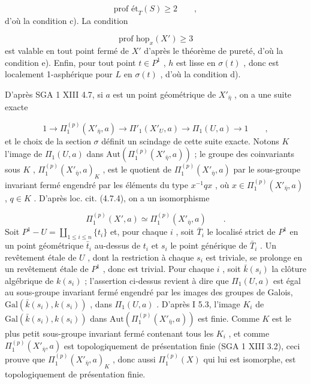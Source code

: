 \begin{equation*}
\text{prof ét}_T(S) \geqslant 2 \qquad ,
\end{equation*}
d'où la condition c). La condition

\begin{equation*}
\text{prof hop}_x(X') \geqslant 3
\end{equation*}
est valable en tout point fermé de $X'$ d'après le théorème de pureté, d'où la condition e). Enfin, pour tout point $t \in P^1$ , $h$ est lisse en $\sigma(t)$ , donc est localement 1-asphérique pour $L$ en $\sigma(t)$ , d'où la condition d).

D'après SGA 1 XIII 4.7, si $a$ est un point géométrique de $X'_{\bar{\eta}}$ , on a une suite exacte

\begin{equation*}
1 \longrightarrow \Pi_1^{(p)}(X'_{\bar{\eta}},a) \longrightarrow \Pi'_1(X'_U,a) \longrightarrow \Pi_1(U,a) \longrightarrow 1 \qquad ,
\end{equation*}
et le choix de la section $\sigma$ définit un scindage de cette suite exacte. Notons $K$ l'image de $\Pi_1(U,a)$ dans $\mathrm{Aut}(\Pi_1^{(p)}(X'_{\bar{\eta}},a))$ ; le groupe des coinvariants sous $K$ , $\Pi_1^{(p)}(X'_{\bar{\eta}},a)_K$ , est le quotient de $\Pi_1^{(p)}(X'_{\bar{\eta}},a)$ par le sous-groupe invariant fermé engendré par les éléments du type $x^{-1}qx$ , où $x \in \Pi_1^{(p)}(X'_{\bar{\eta}},a)$ , $q \in K$ . D'après loc. cit. (4.7.4), on a un isomorphisme

\begin{equation*}
\Pi_1^{(p)}(X',a) \simeq \Pi_1^{(p)}(X'_{\bar{\eta}},a) \qquad .
\end{equation*}
Soit $P^1 - U = \coprod_{1\leqslant i\leqslant n} \{t_i\}$ et, pour chaque $i$ , soit $\bar{T}_i$ le localisé strict de $P^1$ en un point géométrique $\bar{t}_i$ au-dessus de $t_i$ et $s_i$ le point générique de $\bar{T}_i$ . Un revêtement étale de $U$ , dont la restriction à chaque $s_i$ est triviale, se prolonge en un revêtement étale de $P^1$ , donc est trivial. Pour chaque $i$ , soit $\bar{k}(s_i)$ la clôture algébrique de $k(s_i)$ ; l'assertion ci-dessus revient à dire que $\Pi_1(U,a)$ est égal au sous-groupe invariant fermé engendré par les images des groupes de Galois, $\mathrm{Gal}(\bar{k}(s_i),k(s_i))$ , dans $\Pi_1(U,a)$ . D'après I 5.3, l'image $K_i$ de $\mathrm{Gal}(\bar{k}(s_i),k(s_i))$ dans $\mathrm{Aut}(\Pi_1^{(p)}(X'_{\bar{\eta}},a))$ est finie. Comme $K$ est le plus petit sous-groupe invariant fermé contenant tous les $K_i$ , et comme $\Pi_1^{(p)}(X'_{\bar{\eta}},a)$ est topologiquement de présentation finie (SGA 1 XIII 3.2), ceci prouve que $\Pi_1^{(p)}(X'_{\bar{\eta}},a)_K$ , donc aussi $\Pi_1^{(p)}(X)$ qui lui est isomorphe, est topologiquement de présentation finie.


